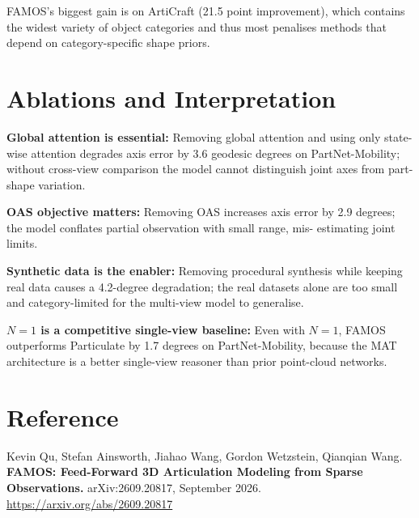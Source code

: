 \documentclass[10pt,twocolumn]{article}
\begin{document}
FAMOS's biggest gain is on ArtiCraft (21.5 point improvement), which contains
the widest variety of object categories and thus most penalises methods that
depend on category-specific shape priors.

\section{Ablations and Interpretation}

\textbf{Global attention is essential:} Removing global attention and using
only state-wise attention degrades axis error by 3.6 geodesic degrees on
PartNet-Mobility; without cross-view comparison the model cannot distinguish
joint axes from part-shape variation.

\textbf{OAS objective matters:} Removing OAS increases axis error by 2.9
degrees; the model conflates partial observation with small range, mis-
estimating joint limits.

\textbf{Synthetic data is the enabler:} Removing procedural synthesis while
keeping real data causes a 4.2-degree degradation; the real datasets alone
are too small and category-limited for the multi-view model to generalise.

\textbf{$N=1$ is a competitive single-view baseline:} Even with $N=1$,
FAMOS outperforms Particulate by 1.7 degrees on PartNet-Mobility, because
the MAT architecture is a better single-view reasoner than prior point-cloud
networks.

\section*{Reference}

Kevin Qu, Stefan Ainsworth, Jiahao Wang, Gordon Wetzstein, Qianqian Wang.
\textbf{FAMOS: Feed-Forward 3D Articulation Modeling from Sparse Observations.}
arXiv:2609.20817, September 2026.
\url{https://arxiv.org/abs/2609.20817}
\end{document}
